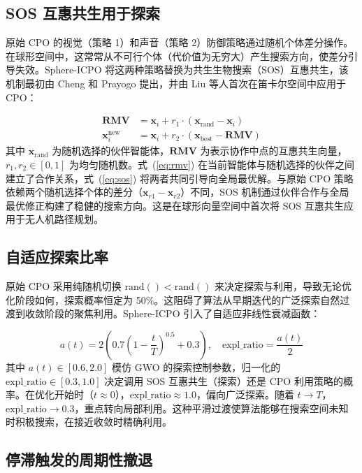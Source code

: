 \documentclass[11pt,a4paper]{ctexart}
\begin{document}
\subsection{SOS 互惠共生用于探索}

原始 CPO 的视觉（策略 1）和声音（策略 2）防御策略通过随机个体差分操作。在球形空间中，这常常从不可行个体（代价值为无穷大）产生搜索方向，使差分引导失效。Sphere-ICPO 将这两种策略替换为共生生物搜索（SOS）互惠共生，该机制最初由 Cheng 和 Prayogo 提出，并由 Liu 等人首次在笛卡尔空间中应用于 CPO：

\begin{align}
    \mathbf{RMV} &= \mathbf{x}_i + r_1 \cdot (\mathbf{x}_{\text{rand}} - \mathbf{x}_i) \label{eq:rmv} \\
    \mathbf{x}_i^{\text{new}} &= \mathbf{x}_i + r_2 \cdot (\mathbf{x}_{\text{best}} - \mathbf{RMV}) \label{eq:sos}
\end{align}
其中 $\mathbf{x}_{\text{rand}}$ 为随机选择的伙伴智能体，$\mathbf{RMV}$ 为表示协作中点的互惠共生向量，$r_1, r_2 \in [0,1]$ 为均匀随机数。式~(\ref{eq:rmv}) 在当前智能体与随机选择的伙伴之间建立了合作关系，式~(\ref{eq:sos}) 将两者共同引导向全局最优解。与原始 CPO 策略依赖两个随机选择个体的差分（$\mathbf{x}_{r1} - \mathbf{x}_{r2}$）不同，SOS 机制通过伙伴合作与全局最优修正构建了稳健的搜索方向。这是在球形向量空间中首次将 SOS 互惠共生应用于无人机路径规划。

\subsection{自适应探索比率}

原始 CPO 采用纯随机切换 $\text{rand}() < \text{rand}()$ 来决定探索与利用，导致无论优化阶段如何，探索概率恒定为 50\%。这阻碍了算法从早期迭代的广泛探索自然过渡到收敛阶段的聚焦利用。Sphere-ICPO 引入了自适应非线性衰减函数：

\begin{equation}
    a(t) = 2 \left(0.7\left(1 - \frac{t}{T}\right)^{0.5} + 0.3\right), \quad \text{expl\_ratio} = \frac{a(t)}{2}
\end{equation}
其中 $a(t) \in [0.6, 2.0]$ 模仿 GWO 的探索控制参数，归一化的 $\text{expl\_ratio} \in [0.3, 1.0]$ 决定调用 SOS 互惠共生（探索）还是 CPO 利用策略的概率。在优化开始时（$t \approx 0$），$\text{expl\_ratio} \approx 1.0$，偏向广泛探索。随着 $t \rightarrow T$，$\text{expl\_ratio} \rightarrow 0.3$，重点转向局部利用。这种平滑过渡使算法能够在搜索空间未知时积极搜索，在接近收敛时精确利用。

\subsection{停滞触发的周期性撤退}
\end{document}
